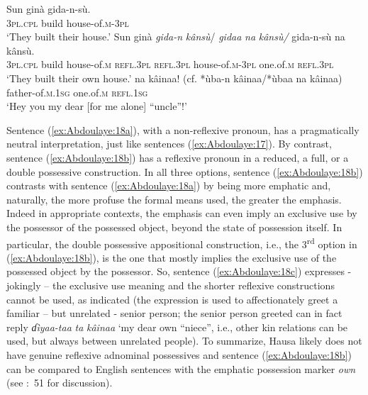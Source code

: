 \documentclass[output=paper]{langscibook}
\begin{document}
\ea%
    \label{ex:Abdoulaye:18}
    \ea \label{ex:Abdoulaye:18a}
    \gll  Sun  ginà  gida-n-sù.\\
    \textsc{3pl.cpl}  build  house-of.\textsc{m-3pl}\\
    \glt `They built their house.’
    \ex \label{ex:Abdoulaye:18b}
    \gll  Sun  ginà  \textit{gida-n}  \textit{kânsù}/  \textit{gidaa}  \textit{na}  \textit{kânsù/} gida-n-sù	na	kânsù.\\
    \textsc{3pl.cpl}  build  house-of.\textsc{m}  \textsc{refl.3pl}   \textsc{refl.3pl}  house-of.\textsc{m-3pl}  one.of.\textsc{m}  \textsc{refl.3pl}\\
    \glt `They built their own house.’
    \ex \label{ex:Abdoulaye:18c}
     {na}  {kâinaa!} {(cf. *ùba-n kâinaa/*ùbaa na kâinaa)}\\
    {father-of.\textsc{m.1sg}}  {one.of.\textsc{m}}  \textsc{refl.1sg} {}\\
    \glt `Hey you my dear [for me alone] “uncle”!’
    \z
\z

Sentence (\ref{ex:Abdoulaye:18a}), with a non-reflexive pronoun, has a pragmatically neutral interpretation, just like sentences (\ref{ex:Abdoulaye:17}). By contrast, sentence (\ref{ex:Abdoulaye:18b}) has a reflexive pronoun in a reduced, a full, or a double possessive construction. In all three options, sentence (\ref{ex:Abdoulaye:18b}) contrasts with sentence (\ref{ex:Abdoulaye:18a}) by being more emphatic and, naturally, the more profuse the formal means used, the greater the emphasis. Indeed in appropriate contexts, the emphasis can even imply an exclusive use by the possessor of the possessed object, beyond the state of possession itself. In particular, the double possessive appositional construction, i.e., the 3\textsuperscript{rd} option in (\ref{ex:Abdoulaye:18b}), is the one that mostly implies the exclusive use of the possessed object by the possessor. So, sentence (\ref{ex:Abdoulaye:18c}) expresses - jokingly – the exclusive use meaning and the shorter reflexive constructions cannot be used, as indicated (the expression is used to affectionately greet a familiar – but unrelated - senior person; the senior person greeted can in fact reply \textit{ɗìyaa-taa} \textit{ta} \textit{kâinaa} ‘my dear own “niece”, i.e., other kin relations can be used, but always between unrelated people). To summarize, Hausa likely does not have genuine reflexive adnominal possessives and sentence (\ref{ex:Abdoulaye:18b}) can be compared to English sentences with the emphatic possession marker \textit{own} (see \citealt{Haspelmath2008}:~51 for discussion).
\end{document}

